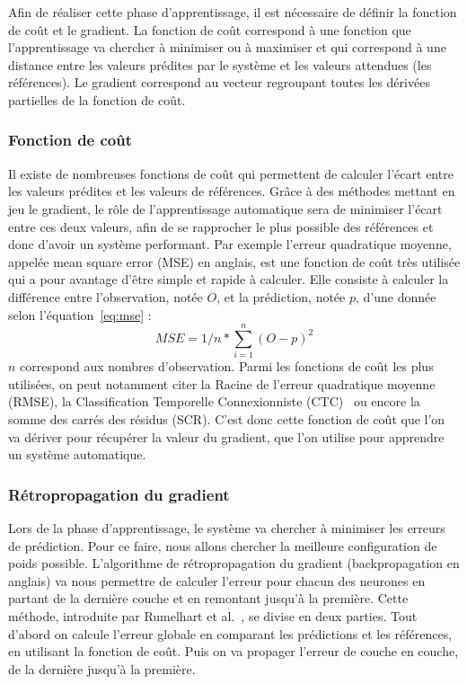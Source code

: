 Afin de réaliser cette phase d'apprentissage, il est nécessaire de définir la fonction de coût et le gradient. La fonction de coût correspond à une fonction que l'apprentissage va chercher à minimiser ou à maximiser et qui correspond à une distance entre les valeurs prédites par le système et les valeurs attendues (les références). Le gradient correspond au vecteur regroupant toutes les dérivées partielles de la fonction de coût.

\subsubsection{Fonction de coût}
Il existe de nombreuses fonctions de coût qui permettent de calculer l'écart entre les valeurs prédites et les valeurs de références. Grâce à des méthodes mettant en jeu le gradient, le rôle de l'apprentissage automatique sera de minimiser l'écart entre ces deux valeurs, afin de se rapprocher le plus possible des références et donc d'avoir un système performant.
Par exemple l'erreur quadratique moyenne, appelée mean square error (MSE) en anglais, est une fonction de coût très utilisée qui a pour avantage d'être simple et rapide à calculer. Elle consiste à calculer la différence entre l'observation, notée $O$, et la prédiction, notée $p$, d'une donnée selon l'équation~\ref{eq:mse} :
\begin{equation}
  MSE = 1/n*\sum_{i=1}^{n}(O-p)^2
  \label{eq:mse}
\end{equation}
$n$ correspond aux nombres d'observation. Parmi les fonctions de coût les plus utilisées, on peut notamment citer la Racine de l'erreur quadratique moyenne (RMSE), la Classification Temporelle Connexionniste (CTC)~\cite{Graves2006} ou encore la somme des carrés des résidus (SCR). C'est donc cette fonction de coût que l'on va dériver pour récupérer la valeur du gradient, que l'on utilise pour apprendre un système automatique.

\subsubsection{Rétropropagation du gradient}

Lors de la phase d'apprentissage, le système va chercher à minimiser les erreurs de prédiction. Pour ce faire, nous allons chercher la meilleure configuration de poids possible. L'algorithme de rétropropagation du gradient (backpropagation en anglais) va nous permettre de calculer l'erreur pour chacun des neurones en partant de la dernière couche et en remontant jusqu'à la première. Cette méthode, introduite par Rumelhart et al.~\cite{Rumelhart1986}, se divise en deux parties. Tout d'abord on calcule l'erreur globale en comparant les prédictions et les références, en utilisant la fonction de coût. Puis on va propager l'erreur de couche en couche, de la dernière jusqu'à la première.

